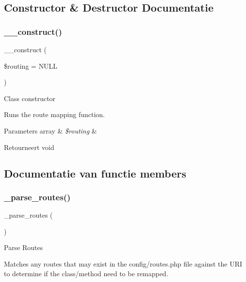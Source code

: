 \subsection{Constructor \& Destructor Documentatie}
\mbox{\label{class_c_i___router_a9b81050c9907794a374f5088743a0252}} 
\subsubsection{\texorpdfstring{\_\_construct()}{\_\_construct()}}
{\footnotesize\ttfamily \+\_\+\+\_\+construct (\begin{DoxyParamCaption}\item[{}]{\$routing = {\ttfamily NULL} }\end{DoxyParamCaption})}

Class constructor

Runs the route mapping function.


\begin{DoxyParams}[1]{Parameters}
array & {\em \$routing} & \\
\hline
\end{DoxyParams}
\begin{DoxyReturn}{Retourneert}
void 
\end{DoxyReturn}


\subsection{Documentatie van functie members}
\mbox{\label{class_c_i___router_a55a42fae865d03334b49baa5a5a6bd0b}} 
\subsubsection{\texorpdfstring{\_parse\_routes()}{\_parse\_routes()}}
{\footnotesize\ttfamily \+\_\+parse\+\_\+routes (\begin{DoxyParamCaption}{ }\end{DoxyParamCaption})\hspace{0.3cm}{\ttfamily [protected]}}

Parse Routes

Matches any routes that may exist in the config/routes.\+php file against the U\+RI to determine if the class/method need to be remapped.

